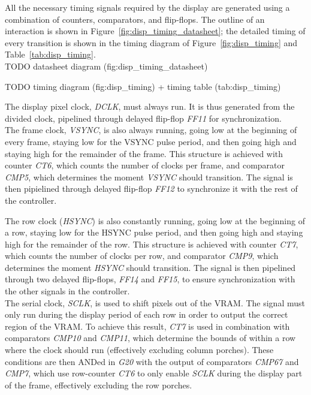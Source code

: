 \documentclass{scrartcl}
\begin{document}
{	All the necessary timing signals required by the display are generated using a combination of counters, comparators, and flip-flops. The outline of an interaction is shown in Figure~\ref{fig:disp_timing_datasheet}; the detailed timing of every transition is shown in the timing diagram of Figure~\ref{fig:disp_timing} and Table~\ref{tab:disp_timing}.\\

	TODO datasheet diagram (fig:disp_timing_datasheet)

	TODO timing diagram (fig:disp_timing) + timing table (tab:disp_timing)

	The display pixel clock, \textit{DCLK}, must always run. It is thus generated from the divided clock, pipelined through delayed flip-flop \textit{FF11} for synchronization.\\

	The frame clock, \textit{VSYNC}, is also always running, going low at the beginning of every frame, staying low for the VSYNC pulse period, and then going high and staying high for the remainder of the frame. This structure is achieved with counter \textit{CT6}, which counts the number of clocks per frame, and comparator \textit{CMP5}, which determines the moment \textit{VSYNC} should transition. The signal is then pipielined through delayed flip-flop \textit{FF12} to synchronize it with the rest of the controller.

	The row clock (\textit{HSYNC}) is also constantly running, going low at the beginning of a row, staying low for the HSYNC pulse period, and then going high and staying high for the remainder of the row. This structure is achieved with counter \textit{CT7}, which counts the number of clocks per row, and comparator \textit{CMP9}, which determines the moment \textit{HSYNC} should transition. The signal is then pipelined through two delayed flip-flops, \textit{FF14} and \textit{FF15}, to ensure synchronization with the other signals in the controller.\\
	
	The serial clock, \textit{SCLK}, is used to shift pixels out of the VRAM. The signal must only run during the display period of each row in order to output the correct region of the VRAM. To achieve this result, \textit{CT7} is used in combination with comparators \textit{CMP10} and \textit{CMP11}, which determine the bounds of within a row where the clock should run (effectively excluding column porches). These conditions are then ANDed in \textit{G20} with the output of comparators \textit{CMP67} and \textit{CMP7}, which use row-counter \textit{CT6} to only enable \textit{SCLK} during the display part of the frame, effectively excluding the row porches.\\

}
\end{document}
